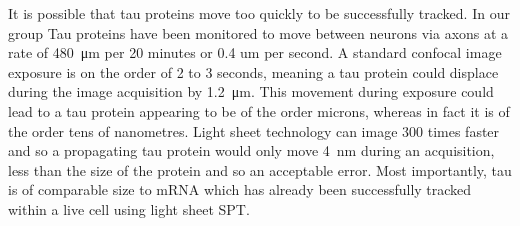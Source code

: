 It is possible that tau proteins move too quickly to be successfully tracked.
In our group Tau proteins have been monitored to move between neurons via axons at a rate of \SI{480}{\micro\meter} per 20 minutes or 0.4 um per second.
A standard confocal image exposure is on the order of 2 to 3 seconds, meaning a tau protein could displace during the image acquisition by \SI{1.2}{\micro\meter}.
This movement during exposure could lead to a tau protein appearing to be of the order microns, whereas in fact it is of the order tens of nanometres.
Light sheet technology can image \SI{300}{} times faster and so a propagating tau protein would only move \SI{4}{\nano\meter} during an acquisition, less than the size of the protein and so an acceptable error.
Most importantly, tau is of comparable size to mRNA which has already been successfully tracked within a live cell using light sheet SPT\cite{Spille2015a}.

